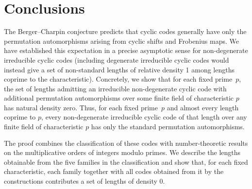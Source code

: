 \documentclass[11pt]{article}
\begin{document}
\section{Conclusions}\label{sec:conclusions}
%
The Berger--Charpin conjecture predicts that cyclic codes
generally have only the permutation automorphisms arising
from cyclic shifts and Frobenius maps. 
We have established this expectation in a precise asymptotic
sense for non-degenerate irreducible cyclic codes 
(including degenerate irreducible cyclic codes would instead
give a set of non-standard lengths of relative density 1 among lengths coprime to the characteristic).
Concretely, we show that for each fixed prime~$p$,
the set of lengths admitting an irreducible non-degenerate cyclic
code with additional permutation automorphisms over some finite
field of characteristic $p$ has natural density zero. Thus, for each fixed prime~$p$ and almost every length coprime
to $p$, every non-degenerate irreducible cyclic code of that
length over any finite field of characteristic $p$ has only
the standard permutation automorphisms.

The proof combines the classification of these codes with
number-theoretic results on the multiplicative orders of integers
modulo primes. 
We describe the lengths obtainable from the five families in the
classification and show that, for each fixed characteristic,
each family together with all codes obtained from it by the
constructions contributes a set of lengths of density 0.


\end{document}
